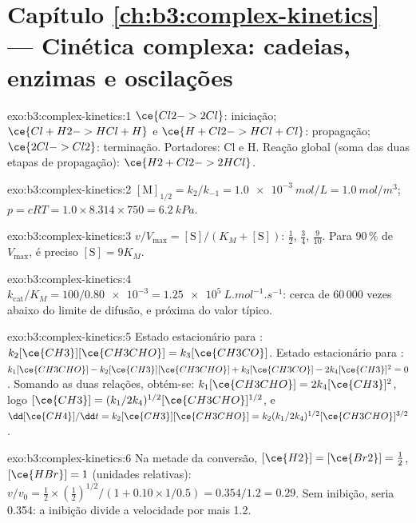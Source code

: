 \section*{Capítulo \ref{ch:b3:complex-kinetics} --- Cinética complexa: cadeias, enzimas e oscilações}

\begin{solution}{exo:b3:complex-kinetics:1}
$\ce{Cl2 -> 2 Cl}$: iniciação; $\ce{Cl + H2 -> HCl + H}$ e $\ce{H + Cl2 -> HCl + Cl}$:
propagação; $\ce{2 Cl -> Cl2}$: terminação. Portadores: Cl e H. Reação global (soma das
duas etapas de propagação): $\ce{H2 + Cl2 -> 2 HCl}$.
\end{solution}

\begin{solution}{exo:b3:complex-kinetics:2}
$[\mathrm M]_{1/2} = k_2/k_{-1} = \qty{1.0e-3}{mol/L} = \qty{1.0}{mol/m^3}$; $p = cRT = 1.0 \times 8.314 \times 750 =
\qty{6.2}{kPa}$.
\end{solution}

\begin{solution}{exo:b3:complex-kinetics:3}
$v/V_{\max} = [\mathrm S]/(K_M + [\mathrm S])$: $\frac12$, $\frac34$, $\frac{9}{10}$. Para 90\,\% de $V_{\max}$, é preciso $[\mathrm S] = 9K_M$.
\end{solution}

\begin{solution}{exo:b3:complex-kinetics:4}
$k_{\mathrm{cat}}/K_M = 100/\num{0.80e-3} = \qty{1.25e5}{L.mol^{-1}.s^{-1}}$: cerca de 60\,000 vezes abaixo do limite
de difusão, e próxima do valor típico.
\end{solution}

\begin{solution}{exo:b3:complex-kinetics:5}
Estado estacionário para : $k_2[\ce{CH3}][\ce{CH3CHO}] = k_3[\ce{CH3CO}]$. Estado estacionário para :
$k_1[\ce{CH3CHO}] - k_2[\ce{CH3}][\ce{CH3CHO}] + k_3[\ce{CH3CO}] - 2k_4[\ce{CH3}]^2 = 0$. Somando as duas relações, obtém-se: $k_1[\ce{CH3CHO}] =
2k_4[\ce{CH3}]^2$, logo $[\ce{CH3}] = (k_1/2k_4)^{1/2}[\ce{CH3CHO}]^{1/2}$, e $\dd[\ce{CH4}]/\dd t = k_2[\ce{CH3}][\ce{CH3CHO}] =
k_2(k_1/2k_4)^{1/2}[\ce{CH3CHO}]^{3/2}$.
\end{solution}

\begin{solution}{exo:b3:complex-kinetics:6}
Na metade da conversão, $[\ce{H2}] = [\ce{Br2}] = \frac12$, $[\ce{HBr}] = 1$ (unidades relativas):
$v/v_0 = \frac12 \times (\frac12)^{1/2}/(1 + 0.10 \times 1/0.5) = 0.354/1.2 = 0.29$. Sem inibição, seria
0.354: a inibição divide a velocidade por mais 1.2.
\end{solution}

